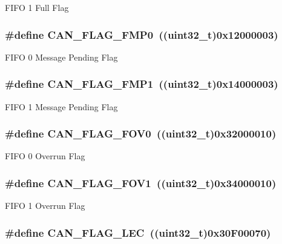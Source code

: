 \label{group__CAN__flags_ga0fa967743c5db04189bb2160aa48e371}
FIFO 1 Full Flag \hypertarget{group__CAN__flags_ga4b40574700edfe752433bb4e0d457c64}{
\subsubsection[{CAN\_\-FLAG\_\-FMP0}]{\setlength{\rightskip}{0pt plus 5cm}\#define CAN\_\-FLAG\_\-FMP0~((uint32\_\-t)0x12000003)}}
\label{group__CAN__flags_ga4b40574700edfe752433bb4e0d457c64}
FIFO 0 Message Pending Flag \hypertarget{group__CAN__flags_ga5d4b7376954a059fbd74ed8d688f6657}{
\subsubsection[{CAN\_\-FLAG\_\-FMP1}]{\setlength{\rightskip}{0pt plus 5cm}\#define CAN\_\-FLAG\_\-FMP1~((uint32\_\-t)0x14000003)}}
\label{group__CAN__flags_ga5d4b7376954a059fbd74ed8d688f6657}
FIFO 1 Message Pending Flag \hypertarget{group__CAN__flags_ga2abd66b5e0032132673208decd2d01f2}{
\subsubsection[{CAN\_\-FLAG\_\-FOV0}]{\setlength{\rightskip}{0pt plus 5cm}\#define CAN\_\-FLAG\_\-FOV0~((uint32\_\-t)0x32000010)}}
\label{group__CAN__flags_ga2abd66b5e0032132673208decd2d01f2}
FIFO 0 Overrun Flag \hypertarget{group__CAN__flags_gac1af6e61b1285ddc4658c4bcc152719a}{
\subsubsection[{CAN\_\-FLAG\_\-FOV1}]{\setlength{\rightskip}{0pt plus 5cm}\#define CAN\_\-FLAG\_\-FOV1~((uint32\_\-t)0x34000010)}}
\label{group__CAN__flags_gac1af6e61b1285ddc4658c4bcc152719a}
FIFO 1 Overrun Flag \hypertarget{group__CAN__flags_ga73a774fa4d391aec0ea6552bf9372917}{
\subsubsection[{CAN\_\-FLAG\_\-LEC}]{\setlength{\rightskip}{0pt plus 5cm}\#define CAN\_\-FLAG\_\-LEC~((uint32\_\-t)0x30F00070)}}
